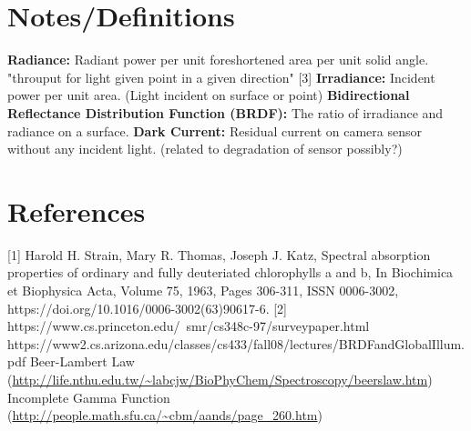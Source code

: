 \documentclass{article}
\begin{document}
\section{Notes/Definitions}

\textbf{Radiance:} Radiant power per unit foreshortened area per unit solid angle. "throuput for light given point in a given direction" [3]
\newline
\textbf{Irradiance:} Incident power per unit area. (Light incident on surface or point)
\newline
\textbf{Bidirectional Reflectance Distribution Function (BRDF):} The ratio of irradiance and radiance on a surface.
\textbf{Dark Current:} Residual current on camera sensor without any incident light. (related to degradation of sensor possibly?)



\section{References}

[1] Harold H. Strain, Mary R. Thomas, Joseph J. Katz, Spectral absorption properties of ordinary and fully deuteriated chlorophylls a and b,
In Biochimica et Biophysica Acta, Volume 75, 1963, Pages 306-311,
ISSN 0006-3002, https://doi.org/10.1016/0006-3002(63)90617-6. \newline
[2] https://www.cs.princeton.edu/~smr/cs348c-97/surveypaper.html \newline
[3] https://www2.cs.arizona.edu/classes/cs433/fall08/lectures/BRDFandGlobalIllum.pdf
\newline
[4] Beer-Lambert Law (\url{http://life.nthu.edu.tw/~labcjw/BioPhyChem/Spectroscopy/beerslaw.htm}) \newline
[5] Incomplete Gamma Function (\url{http://people.math.sfu.ca/~cbm/aands/page_260.htm})
\end{document}
